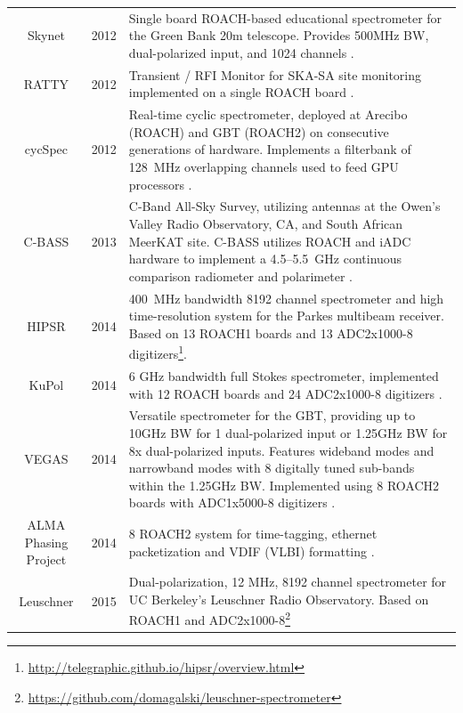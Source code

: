 \documentclass{ws-jai}
\begin{document}
\begin{longtable}{ccp{10cm}}
  Skynet           & 2012 & Single board ROACH-based educational spectrometer for the Green Bank 20m telescope. Provides 500MHz BW, dual-polarized input, and 1024 channels \citep{skynet}. \\
  RATTY            & 2012 & Transient / RFI Monitor for SKA-SA site monitoring implemented on a single ROACH board \citep{Foley01082016, man14}. \\
  cycSpec          & 2012 & Real-time cyclic spectrometer, deployed at Arecibo (ROACH) and GBT (ROACH2) on consecutive generations of hardware. Implements a filterbank of 128~MHz overlapping channels used to feed GPU processors \citep{cycspec}. \\
  C-BASS           & 2013 & C-Band All-Sky Survey, utilizing antennas at the Owen's Valley Radio Observatory, CA, and South African MeerKAT site. C-BASS utilizes ROACH and iADC hardware to implement a 4.5--5.5~GHz continuous comparison radiometer and polarimeter \citep{chuckles-thesis}.\\
  HIPSR            & 2014 & 400~MHz bandwidth 8192 channel spectrometer and high time-resolution system for the Parkes multibeam receiver. Based on 13 ROACH1 boards and 13 ADC2x1000-8 digitizers\footnote{\url{http://telegraphic.github.io/hipsr/overview.html}}. \\
  KuPol            & 2014 & 6 GHz bandwidth full Stokes spectrometer, implemented with 12 ROACH boards and 24 ADC2x1000-8 digitizers \citep{2013arXiv1303.2131M}. \\
  VEGAS            & 2014 & Versatile spectrometer for the GBT, providing up to 10GHz BW for 1 dual-polarized input or 1.25GHz BW for 8x dual-polarized inputs. Features wideband modes and narrowband modes with 8 digitally tuned sub-bands within the 1.25GHz BW. Implemented using 8 ROACH2 boards with ADC1x5000-8 digitizers \citep{chennamangalam2014gpu}. \\
  ALMA Phasing Project& 2014 & 8 ROACH2 system for time-tagging, ethernet packetization and VDIF (VLBI) formatting \citep{2012evn..confE..53A}. \\
  Leuschner        & 2015 & Dual-polarization, 12 MHz, 8192 channel spectrometer for UC Berkeley's Leuschner Radio Observatory. Based on ROACH1 and ADC2x1000-8\footnote{\url{https://github.com/domagalski/leuschner-spectrometer}} \\

\end{longtable}
\end{document}
